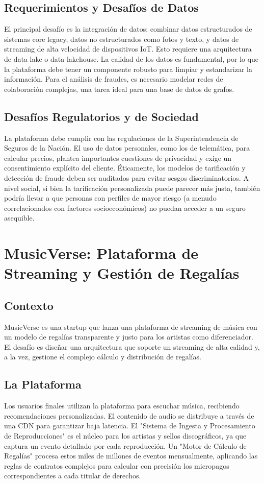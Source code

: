\documentclass[12pt]{article}
\begin{document}
\subsection{Requerimientos y Desafíos de Datos}
El principal desafío es la integración de datos: combinar datos estructurados de sistemas core legacy, datos no estructurados como fotos y texto, y datos de streaming de alta velocidad de dispositivos IoT. Esto requiere una arquitectura de data lake o data lakehouse. La calidad de los datos es fundamental, por lo que la plataforma debe tener un componente robusto para limpiar y estandarizar la información. Para el análisis de fraudes, es necesario modelar redes de colaboración complejas, una tarea ideal para una base de datos de grafos.

\subsection{Desafíos Regulatorios y de Sociedad}
La plataforma debe cumplir con las regulaciones de la Superintendencia de Seguros de la Nación. El uso de datos personales, como los de telemática, para calcular precios, plantea importantes cuestiones de privacidad y exige un consentimiento explícito del cliente. Éticamente, los modelos de tarificación y detección de fraude deben ser auditados para evitar sesgos discriminatorios. A nivel social, si bien la tarificación personalizada puede parecer más justa, también podría llevar a que personas con perfiles de mayor riesgo (a menudo correlacionados con factores socioeconómicos) no puedan acceder a un seguro asequible.

\newpage

\section{MusicVerse: Plataforma de Streaming y Gestión de Regalías}

\subsection{Contexto}
MusicVerse es una startup que lanza una plataforma de streaming de música con un modelo de regalías transparente y justo para los artistas como diferenciador. El desafío es diseñar una arquitectura que soporte un streaming de alta calidad y, a la vez, gestione el complejo cálculo y distribución de regalías.

\subsection{La Plataforma}
Los usuarios finales utilizan la plataforma para escuchar música, recibiendo recomendaciones personalizadas. El contenido de audio se distribuye a través de una CDN para garantizar baja latencia. El "Sistema de Ingesta y Procesamiento de Reproducciones" es el núcleo para los artistas y sellos discográficos, ya que captura un evento detallado por cada reproducción. Un "Motor de Cálculo de Regalías" procesa estos miles de millones de eventos mensualmente, aplicando las reglas de contratos complejos para calcular con precisión los micropagos correspondientes a cada titular de derechos.
\end{document}
